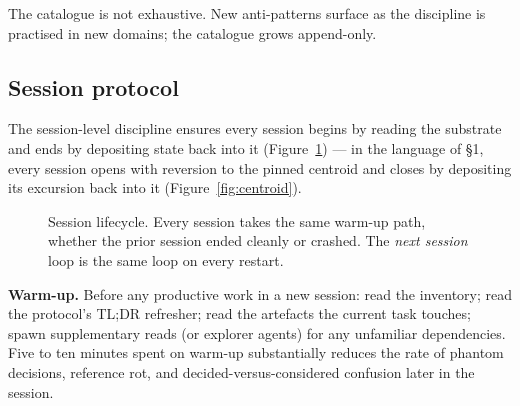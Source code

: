 \documentclass[11pt,a4paper,twocolumn]{article}
\begin{document}
The catalogue is not exhaustive. New anti-patterns surface as the
discipline is practised in new domains; the catalogue grows
append-only.

\subsection{Session protocol}

The session-level discipline ensures every session begins by
reading the substrate and ends by depositing state back into it
(Figure~\ref{fig:session}) --- in the language of \S1, every
session opens with reversion to the pinned centroid and closes by
depositing its excursion back into it
(Figure~\ref{fig:centroid}).

\begin{figure}[t]
\centering
{}
\caption{Session lifecycle. Every session takes the same warm-up
path, whether the prior session ended cleanly or crashed. The
\emph{next session} loop is the same loop on every restart.}
\label{fig:session}
\end{figure}

\textbf{Warm-up.} Before any productive work in a new session: read
the inventory; read the protocol's TL;DR refresher; read the
artefacts the current task touches; spawn supplementary reads (or
explorer agents) for any unfamiliar dependencies. Five to ten
minutes spent on warm-up substantially reduces the rate of phantom
decisions, reference rot, and decided-versus-considered confusion
later in the session.
\end{document}
